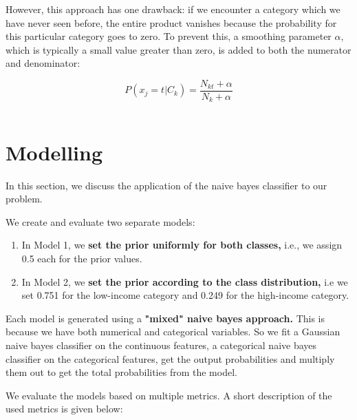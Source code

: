 \documentclass[conference]{IEEEtran}
\begin{document}
However, this approach has one drawback: if we encounter a category which we have never seen before, the entire product vanishes because the probability for this particular category goes to zero. To prevent this, a smoothing parameter $\alpha$, which is typically a small value greater than zero, is added to both the numerator and denominator:

$$ P(x_j=t|C_k) =  \frac{N_{kt} + \alpha}{N_k + \alpha}$$

$$  $$

\section{Modelling }

In this section, we discuss the application of the naive bayes classifier to our problem. 

We create and evaluate two separate models:

\begin{enumerate}
    \item In Model 1, we \textbf{set the prior uniformly for both classes,} i.e., we assign 0.5 each for the prior values.
    \item In Model 2, we \textbf{set the prior according to the class distribution,} i.e we set 0.751 for the low-income category and 0.249 for the high-income category.
\end{enumerate}

Each model is generated using a \textbf{"mixed" naive bayes approach.} This is because we have both numerical and categorical variables. So we fit a Gaussian naive bayes classifier on the continuous features, a categorical naive bayes classifier on the categorical features, get the output probabilities and multiply them out to get the total probabilities from the model.

We evaluate the models based on multiple metrics. A short description of the used metrics is given below:
\end{document}
